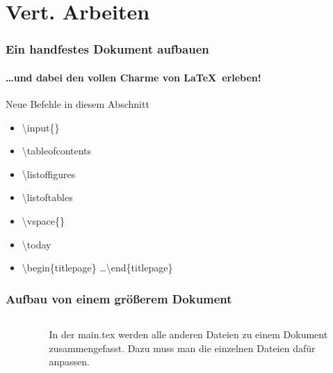 \section{Vert. Arbeiten}
\begin{frame}
\frametitle{Ein handfestes Dokument aufbauen}
\framesubtitle{\ldots und dabei den vollen Charme von \LaTeX ~erleben!}
\begin{block}{Neue Befehle in diesem Abschnitt}
\begin{itemize}
  \item \color{nounibaredI}\textbackslash input\color{black}\{\}
  \item \color{nounibaredI}\textbackslash tableofcontents\color{black}
  \item \color{nounibaredI}\textbackslash listoffigures\color{black}
  \item \color{nounibaredI}\textbackslash listoftables\color{black}
  \item \color{nounibaredI}\textbackslash vspace\color{black}\{\}
  \item \color{nounibaredI}\textbackslash today\color{black}
\item \color{unibablueI}\textbackslash begin\color{black}\{titlepage\} \ldots \color{unibablueI}\textbackslash end\color{black}\{titlepage\} 
\end{itemize}
\end{block}
\end{frame}

\begin{frame}
\frametitle{Aufbau von einem gr\"o\ss erem Dokument}

\begin{columns}
\begin{column}{.5\textwidth}
\footnotesize
\begin{figure}[t]
\end{figure}
\end{column}
\begin{column}{.5\textwidth}
In der main.tex werden alle anderen Dateien zu einem Dokument zusammengefasst. 
Dazu muss man die einzelnen Dateien daf\"ur anpassen.
\end{column}
\end{columns}
\end{frame}


